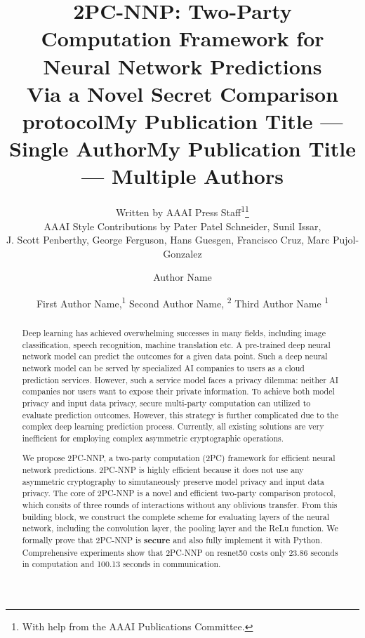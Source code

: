 \documentclass[letterpaper]{article} %
\title{2PC-NNP: Two-Party Computation Framework for Neural Network Predictions \\ Via a Novel Secret Comparison protocol}
\author{
    Written by AAAI Press Staff\textsuperscript{\rm 1}\thanks{With help from the AAAI Publications Committee.}\\
    AAAI Style Contributions by Pater Patel Schneider,
    Sunil Issar,\\
    J. Scott Penberthy,
    George Ferguson,
    Hans Guesgen,
    Francisco Cruz\equalcontrib,
    Marc Pujol-Gonzalez\equalcontrib
}
\title{My Publication Title --- Single Author}
\author {
    Author Name
}
\title{My Publication Title --- Multiple Authors}
\author {
    First Author Name,\textsuperscript{\rm 1}
    Second Author Name, \textsuperscript{\rm 2}
    Third Author Name \textsuperscript{\rm 1}
}
\begin{document}
\maketitle

\begin{abstract}

    Deep learning has achieved overwhelming successes in many fields, including image classification, speech recognition, machine translation etc.
    A pre-trained deep neural network model can predict the outcomes
    for a given data point. Such a deep neural network model can be served by
    specialized AI companies to users as a cloud prediction services.
    However, such a service model faces a privacy dilemma: neither AI companies nor
    users want to expose their private information.
    To achieve both model privacy and input data privacy,
    secure multi-party computation can utilized to evaluate prediction outcomes. However,
    this strategy is further complicated due to the complex deep learning prediction process.
    Currently, all existing solutions are very inefficient for employing complex asymmetric cryptographic operations.

    We propose 2PC-NNP, a two-party computation (2PC) framework for efficient neural network predictions. 2PC-NNP is highly efficient because it does not use any asymmetric cryptography to simutaneously preserve model privacy and input data privacy.
    The core of 2PC-NNP is a novel and efficient two-party comparison protocol,
    which consits of three rounds of interactions without any oblivious transfer.
    From this building block, we construct the complete scheme for evaluating layers of the neural network, including the convolution layer, the pooling layer and the ReLu function.
		We formally prove that 2PC-NNP is {\bf secure} and also fully implement it with Python.
    Comprehensive experiments show that 2PC-NNP on resnet50
    costs only 23.86 seconds in computation and 100.13 seconds in communication.




\end{abstract}
\end{document}
